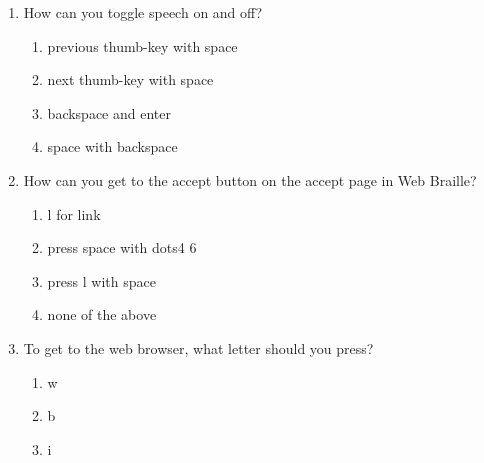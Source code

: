 \documentclass[10pt,letterpaper,twoside]{report}
\begin{document}
{{{{\begin{enumerate}
\begin{enumerate}
		      \item turns Braille on and off
		            
		      \item turns speech on or off
		            
		      \item checks the power status
		            
		            
	      \end{enumerate}
	\item How can you toggle speech on and off?
	      
	      \begin{enumerate}
		      \item previous thumb-key with space
		            
		      \item next thumb-key with space
		            
		      \item backspace and enter
		            
		      \item space with backspace
		            
		            
	      \end{enumerate}
	\item How can you get to the accept button on the accept page in Web Braille?
	      
	      \begin{enumerate}
		      \item l for link
		            
		      \item press space with dots4 6
		            
		      \item press l with space
		            
		      \item none of the above
		            
		            
	      \end{enumerate}
	\item To get to the web browser, what letter should you press?
	      
	      \begin{enumerate}
		      \item w
		            
		      \item b
		            
		      \item i
		            

\end{enumerate}
\end{enumerate}}}}}
\end{document}
